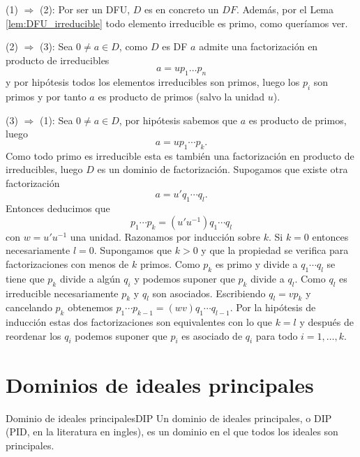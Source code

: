 \begin{proofbox}
(1) $\Rightarrow$ (2): Por ser un DFU, $D$ es en concreto un $DF$. Además, por el Lema \ref{lem:DFU_irreducible} todo elemento irreducible es primo, como queríamos ver.

(2) $\Rightarrow$ (3): Sea $0 \neq a \in D$, como $D$ es DF $a$ admite una factorización en producto de irreducibles
\[
a = u p_1 \dots p_n
\]
y por hipótesis todos los elementos irreducibles son primos, luego los $p_i$ son primos y por tanto $a$ es producto de primos (salvo la unidad $u$).

(3) $\Rightarrow$ (1): Sea $0 \neq a \in D$, por hipótesis sabemos que $a$ es producto de primos, luego
\[
a = u p_1 \cdots p_k.
\]
Como todo primo es irreducible esta es también una factorización en producto de irreducibles, luego $D$ es un dominio de factorización. Supogamos que existe otra factorización
\[
a = u' q_1 \cdots q_l.
\]
Entonces deducimos que 
\[
p_1 \cdots p_k = (u'u^{-1}) q_1 \cdots q_l
\]
con \(w = u'u^{-1}\) una unidad. Razonamos por inducción sobre \(k\). Si \(k = 0\) entonces necesariamente \(l = 0\). Supongamos que \(k > 0\) y que la propiedad se verifica para factorizaciones con menos de \(k\) primos. Como \(p_k\) es primo y divide a \(q_1 \cdots q_l\) se tiene que \(p_k\) divide a algún \(q_i\) y podemos suponer que \(p_k\) divide a \(q_l\). Como \(q_l\) es irreducible necesariamente \(p_k\) y \(q_l\) son asociados. Escribiendo \(q_l = v p_k\) y cancelando \(p_k\) obtenemos \(p_1 \cdots p_{k-1} = (wv) q_1 \cdots q_{l-1}\). Por la hipótesis de inducción estas dos factorizaciones son equivalentes con lo que \(k = l\) y después de reordenar los \(q_i\) podemos suponer que \(p_i\) es asociado de \(q_i\) para todo \(i = 1, \ldots, k\).
\end{proofbox}

\clearpage
\section{Dominios de ideales principales}

\begin{definition}{Dominio de ideales principales}{DIP}
Un dominio de ideales principales, o DIP (PID, en la literatura en ingles), es un dominio en el que todos los ideales son principales.
\end{definition}


